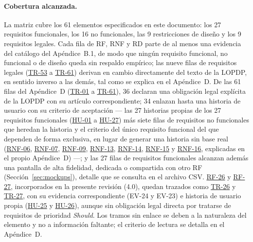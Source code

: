 \documentclass[journal,onecolumn]{IEEEtran}
\begin{document}
\paragraph{Cobertura alcanzada.}
La matriz cubre los 61 elementos especificados en este documento: los 27
requisitos funcionales, los 16 no funcionales, las 9 restricciones de
diseño y los 9 requisitos legales. Cada fila de RF, RNF y RD parte de al
menos una evidencia del catálogo del Apéndice~B.1, de modo que ningún
requisito funcional, no funcional o de diseño queda sin respaldo empírico;
las nueve filas de requisitos legales (\hyperref[tr:53]{TR-53} a \hyperref[tr:61]{TR-61}) derivan en cambio
directamente del texto de la LOPDP, en sentido inverso a las demás, tal
como se explica en el Apéndice~D. De las 61 filas del Apéndice~D (\hyperref[tr:01]{TR-01} a
\hyperref[tr:61]{TR-61}), 36 declaran una obligación legal explícita de la LOPDP con su
artículo correspondiente; 34 enlazan hasta una historia de usuario con su
criterio de aceptación --- las 27 historias propias de los 27 requisitos
funcionales (\hyperref[tab:HU-01]{HU-01} a \hyperref[tab:HU-27]{HU-27}) más siete filas de requisitos no funcionales
que heredan la historia y el criterio del único requisito funcional del
que dependen de forma exclusiva, en lugar de generar una historia sin base
real (\hyperref[tab:RNF-06]{RNF-06}, \hyperref[tab:RNF-07]{RNF-07}, \hyperref[tab:RNF-09]{RNF-09}, \hyperref[tab:RNF-13]{RNF-13}, \hyperref[tab:RNF-14]{RNF-14}, \hyperref[tab:RNF-15]{RNF-15} y \hyperref[tab:RNF-16]{RNF-16}, explicadas
en el propio Apéndice~D) ---; y las 27 filas de requisitos funcionales
alcanzan además una pantalla de alta fidelidad, dedicada o compartida con
otro RF (Sección~\ref{sec:mockups}), detalle que se consulta en el archivo
CSV. \hyperref[tab:RF-26]{RF-26} y \hyperref[tab:RF-27]{RF-27}, incorporados en la presente revisión (4.0), quedan
trazados como \hyperref[tr:26]{TR-26} y \hyperref[tr:27]{TR-27}, con su evidencia correspondiente (EV-24 y
EV-23) e historia de usuario propia (\hyperref[tab:HU-25]{HU-25} y \hyperref[tab:HU-26]{HU-26}), aunque sin obligación
legal directa por tratarse de requisitos de prioridad \emph{Should}. Los
tramos sin enlace se deben a la naturaleza del elemento y no a información
faltante; el criterio de lectura se detalla en el Apéndice~D.
\end{document}
